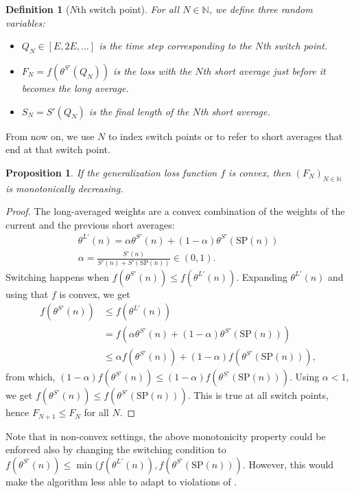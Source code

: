\documentclass[twocolumn]{article}
\newcommand*{\SP}{\mathrm{SP}}
\newtheorem{definition}{Definition}
\newtheorem{proposition}[theorem]{Proposition}
\newcommand{\Nb}{\mathbb{N}}
\begin{document}
\begin{appendices}
\begin{definition}[$N$th switch point]
For all $N \in \Nb$, we define three random variables:
\begin{itemize}
\item $Q_N \in [E, 2E, \dots]$ is the time step corresponding to the $N$th switch point.
\item $F_N = f(\theta^{S'}(Q_N))$ is the loss with the $N$th short average just before it becomes the long average.
\item $S_N = S'(Q_N)$ is the final length of the $N$th short average.
\end{itemize}
\end{definition}

From now on, we use $N$ to index switch points or to refer to short averages that end at that switch point.

\begin{proposition}
\label{prop:f-n-decreasing}
If the generalization loss function $f$ is convex, then $(F_N)_{N \in \Nb}$ is monotonically decreasing.
\end{proposition}
\begin{proof}
The long-averaged weights are a convex combination of the weights of the current and the previous short averages:
\begin{gather*}
\theta^{L'\!\!}(n) = \alpha \theta^{S'\!\!}(n) + (1-\alpha)\theta^{S'\!\!}(\SP(n))\\
\alpha = \frac{S'\!(n)}{S'\!(n) + S'\!(\SP(n))} \in (0,1).
\end{gather*}
Switching happens when $f(\theta^{S'}(n)) \leq f(\theta^{L'}(n))$.
Expanding $\theta^{L'\!\!}(n)$ and using that $f$ is convex, we get
\begin{align*}
f(\theta^{S'\!\!}(n))
&\leq f(\theta^{L'\!\!}(n)) \\
&= f(\alpha \theta^{S'\!\!}(n) + (1-\alpha)\theta^{S'\!\!}(\SP(n))) \\
&\leq \alpha f(\theta^{S'\!\!}(n)) + (1-\alpha)f(\theta^{S'\!\!}(\SP(n))),
\end{align*}
from which, $(1-\alpha)f(\theta^{S'\!\!}(n)) \leq (1-\alpha)f(\theta^{S'\!\!}(\SP(n)))$.
Using $\alpha < 1$, we get $f(\theta^{S'\!\!}(n)) \leq f(\theta^{S'\!\!}(\SP(n)))$.
This is true at all switch points, hence $F_{N+1} \leq F_N$ for all $N$.
\end{proof}

Note that in non-convex settings, the above monotonicity property could be enforced also by changing the switching condition to $f(\theta^{S'\!\!}(n)) \leq \min(f(\theta^{L'\!\!}(n)),\allowbreak f(\theta^{S'\!\!}(\SP(n)))$.
However, this would make the algorithm less able to adapt to violations of .


\end{appendices}
\end{document}
